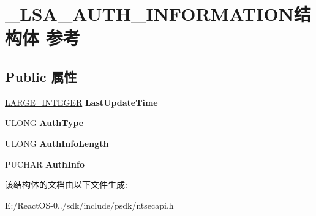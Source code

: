 \hypertarget{struct___l_s_a___a_u_t_h___i_n_f_o_r_m_a_t_i_o_n}{}\section{\+\_\+\+L\+S\+A\+\_\+\+A\+U\+T\+H\+\_\+\+I\+N\+F\+O\+R\+M\+A\+T\+I\+O\+N结构体 参考}
\label{struct___l_s_a___a_u_t_h___i_n_f_o_r_m_a_t_i_o_n}
\subsection*{Public 属性}
\begin{DoxyCompactItemize}
\item 
\mbox{\label{struct___l_s_a___a_u_t_h___i_n_f_o_r_m_a_t_i_o_n_a5e593e465fbc92b82dac2c73aa42b19c}} 
\hyperlink{union___l_a_r_g_e___i_n_t_e_g_e_r}{L\+A\+R\+G\+E\+\_\+\+I\+N\+T\+E\+G\+ER} {\bfseries Last\+Update\+Time}
\item 
\mbox{\label{struct___l_s_a___a_u_t_h___i_n_f_o_r_m_a_t_i_o_n_a1eb135c969f1afb34237d3f8273df00a}} 
U\+L\+O\+NG {\bfseries Auth\+Type}
\item 
\mbox{\label{struct___l_s_a___a_u_t_h___i_n_f_o_r_m_a_t_i_o_n_a11116e5e5cbb20cb64e37486eee939c0}} 
U\+L\+O\+NG {\bfseries Auth\+Info\+Length}
\item 
\mbox{\label{struct___l_s_a___a_u_t_h___i_n_f_o_r_m_a_t_i_o_n_ac473c04b3cb3b98d27edec5f1a5f123b}} 
P\+U\+C\+H\+AR {\bfseries Auth\+Info}
\end{DoxyCompactItemize}


该结构体的文档由以下文件生成\+:\begin{DoxyCompactItemize}
\item 
E\+:/\+React\+O\+S-\/0../sdk/include/psdk/ntsecapi.\+h\end{DoxyCompactItemize}

